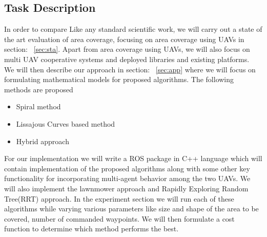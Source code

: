 \subsection{Task Description}
In order to compare 
Like any standard scientific work, we will carry out a state of the art evaluation of area coverage, focusing on area coverage using UAVs in section: ~\ref{sec:sta}. Apart from area coverage using UAVs, we will also focus on multi UAV cooperative systems and deployed libraries and existing platforms. \\
We will then describe our approach in section: ~\ref{sec:app} where we will focus on formulating mathematical models for proposed algorithms. The following methods are proposed
\begin{itemize}
\item Spiral method
\item Lissajous Curves based method
\item Hybrid approach
\end{itemize}
For our implementation we will write a ROS package in C++ language which will contain implementation of the proposed algorithms along with some other key functionality for incorporating multi-agent behavior among the two UAVs. We will also implement the lawnmower approach and Rapidly Exploring Random Tree(RRT) approach. In the experiment section we will run each of these algorithms while varying various parameters like size and shape of the area to be covered, number of commanded waypoints. We will then formulate a cost function to determine which method performs the best. 
